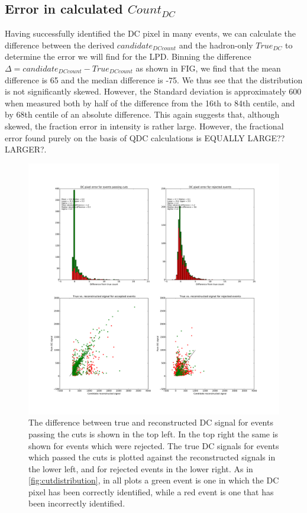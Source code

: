 \documentclass{article}
\begin{document}
\subsection{Error in calculated $Count_{DC}$}
Having successfully identified the DC pixel in many events, we can calculate the difference between the derived $candidate_{DC count}$ and the hadron-only $True_{DC}$ to determine the error we will find for the LPD. Binning the difference $\Delta = candidate_{DC count} - True_{DC count}$ as shown in FIG, we find that the mean difference is 65 and the median difference is -75. We thus see that the distribution is not significantly skewed. However, the Standard deviation is approximately 600 when measured both by half of the difference from the 16th to 84th centile, and by 68th centile of an absolute difference. This again suggests that, although skewed, the fraction error in intensity is rather large. However, the fractional error found purely on the basis of QDC calculations is EQUALLY LARGE??LARGER?.

\begin{figure}
\begin{center}
\includegraphics[width=\textwidth]{DCcounterrorhess1}
\caption{The difference between true and reconstructed DC signal for events passing the cuts is shown in the top left. In the top right the same is shown for events which were rejected. The true DC signals for events which passed the cuts is plotted against the reconstructed signals in the lower left, and for rejected events in the lower right. As in \ref{fig:cutdistribution}, in all plots a green event is one in which the DC pixel has been correctly identified, while a red event is one that has been incorrectly identified.}
\label{fig:dcdiff}
\end{center}
\end{figure}
\end{document}
